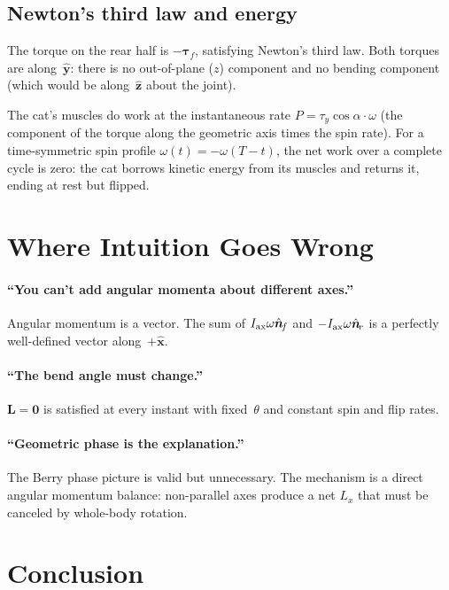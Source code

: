 \documentclass[11pt]{article}
\newcommand{\vect}[1]{\bm{#1}}
\newcommand{\uv}[1]{\hat{\bm{#1}}}
\newcommand{\xhat}{\uv{x}}
\newcommand{\yhat}{\uv{y}}
\newcommand{\zhat}{\uv{z}}
\newcommand{\nf}{\uv{n}_{\!f}}
\newcommand{\nr}{\uv{n}_{\!r}}
\begin{document}
\subsection{Newton's third law and energy}

The torque on the rear half is $-\vect{\tau}_f$, satisfying Newton's
third law.  Both torques are along~$\yhat$: there is no out-of-plane
($z$) component and no bending component (which would be along~$\zhat$
about the joint).

The cat's muscles do work at the instantaneous rate
$P = \tau_y\cos\alpha\cdot\omega$ (the component of the torque along
the geometric axis times the spin rate).  For a time-symmetric spin
profile $\omega(t)=-\omega(T-t)$, the net work over a complete cycle
is zero: the cat borrows kinetic energy from its muscles and returns it,
ending at rest but flipped.

\section{Where Intuition Goes Wrong}

\paragraph{``You can't add angular momenta about different axes.''}
Angular momentum is a vector.  The sum of
$I_{\rm ax}\omega\nf$ and $-I_{\rm ax}\omega\nr$ is a perfectly
well-defined vector along~$+\xhat$.

\paragraph{``The bend angle must change.''}
$\vect{L}=\vect{0}$ is satisfied at every instant with
fixed~$\theta$ and constant spin and flip rates.

\paragraph{``Geometric phase is the explanation.''}
The Berry phase picture is valid but unnecessary.  The mechanism is
a direct angular momentum balance: non-parallel axes produce a net
$L_x$ that must be canceled by whole-body rotation.

\section{Conclusion}
\end{document}
